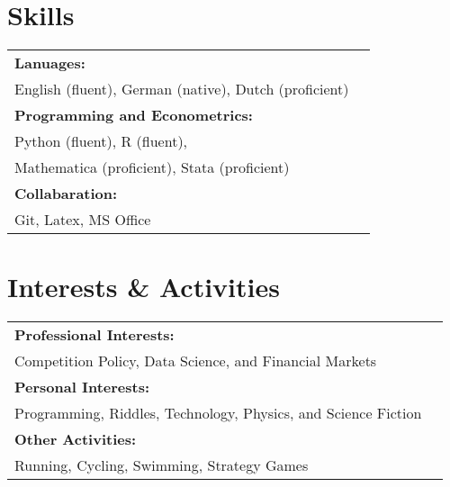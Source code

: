 \documentclass[a4paper,9pt]{article}
\begin{document}
\section{Skills}

\begin{tabular}{p{15cm}r}
  \textbf{Lanuages:}\\
  \hspace{1cm}English (fluent), German (native), Dutch (proficient)\vspace{0.5em} \\
  \textbf{Programming and Econometrics:}\\
  \hspace{1cm}Python (fluent), R (fluent), \\
  \hspace{1cm}Mathematica (proficient), Stata (proficient)&\vspace{0.5em} \\
  \textbf{Collabaration:}\\
  \hspace{1cm}Git, Latex, MS Office
\end{tabular}

\section{Interests \& Activities}

\begin{tabular}{p{15cm}r}
  \textbf{Professional Interests:}\\
    \hspace{1cm}Competition Policy, Data Science, and Financial Markets \vspace{0.5em}\\
  \textbf{Personal Interests:}\\
    \hspace{1cm}Programming, Riddles, Technology, Physics, and Science Fiction\vspace{0.5em}\\
  \textbf{Other Activities:}\\
    \hspace{1cm}Running, Cycling, Swimming, Strategy Games
\end{tabular}
\end{document}
